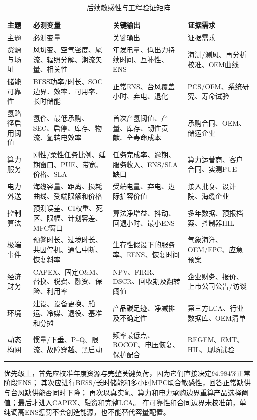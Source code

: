 \begin{longtable}{p{2.0cm}p{3.6cm}p{4.1cm}p{3.1cm}}
\caption{后续敏感性与工程验证矩阵}\label{tab:c5-next-tests}\\
\toprule
主题 & 必测变量 & 关键输出 & 证据需求\\
\midrule
\endfirsthead
\toprule
主题 & 必测变量 & 关键输出 & 证据需求\\
\midrule
\endhead
资源与场址 & 风切变、空气密度、尾流、辐照分解、潮流矢量、相关性 & 年发电量、低出力持续时间、互补性、ENS & 海测/测风、再分析校准、OEM曲线\\
储能可靠性 & BESS功率/时长、SOC边界、效率、可用率、长时储能 & 正常ENS、台风覆盖小时、弃电、退化 & PCS/\allowbreak OEM、系统研究、寿命试验\\
氢路径启用阈值 & 氢价、最低承购、SEC、启停、库存、物流、氢转电效率 & 首次产氢阈值、产量、库存、韧性贡献、全寿命成本 & 承购合同、OEM、储运企业\\
算力服务 & 刚性/柔性任务比例、延期窗口、PUE、带宽、价格、SLA & 任务完成率、逾期、服务收入、ENS/SLA缺口 & 算力运营商、客户合同、实测PUE\\
电力外送 & 海缆容量、距离、损耗曲线、受端限额和价格 & 受端电量、弃电、边际扩容价值 & 接入批复、设计院、海缆企业\\
控制算法 & 预测误差、CI权重、死区、限幅、计划容差、MPC窗口 & 算法净增益、抖动、回退小时、最小ENS & 多年数据、预报档案、控制器HIL\\
极端事件 & 预警时长、过境时长、共因停机、通信中断、恢复斜率 & 生存性假设下的服务率、EENS、恢复时间 & 气象海洋、OEM/\allowbreak EPC、应急预案\\
经济财务 & CAPEX、固定O\&M、替换、税费、融资、保险、利用率 & NPV、FIRR、DSCR、回收期及翻转阈值 & 企业财务、报价、上市公司公告/访谈\\
环境 & 建设、设备更换、船运、冷媒、退役、基准和分摊 & 产品碳足迹、净减排及不确定性 & 第三方LCA、行业数据库、OEM清单\\
动态构网 & 惯量/下垂、P--Q、限流、故障穿越、黑启动 & 频率最低点、ROCOF、电压恢复、保护配合 & REGFM、EMT、HIL、现场试验\\
\bottomrule
\end{longtable}

优先级上，首先应校准年度资源与完整关键负荷，因为它们直接决定94.984\%正常阶段ENS；
其次应进行BESS/长时储能和多小时MPC联合敏感性，回答正常缺供与台风缺供能否同时下降；
再次以真实氢、算力和电力承购边界重算产品选择阈值；最后才进入CAPEX、融资和完整LCA。
在可靠性和合同边界未校准前，单纯调高ENS惩罚不会创造能源，也不能替代容量配置。

